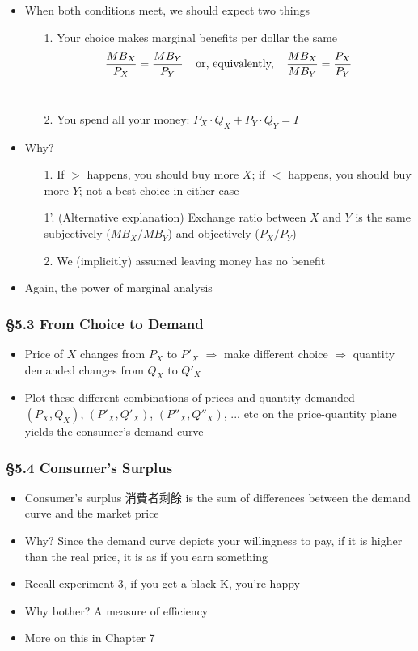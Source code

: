 \documentclass[12pt, xcolor=dvipsnames]{beamer}
\begin{document}
\begin{frame}
\begin{itemize}
	\item When both conditions meet, we should expect two things
	\begin{itemize}
		\item[1.] Your choice makes marginal benefits per dollar the same
		\[{MB_X\over P_X}={MB_Y\over P_Y} \;\;\;\;\mbox{or, equivalently,}\;\;\;\; {MB_X\over MB_Y}={P_X\over P_Y}\] \\[-5mm]
		\item[2.] You spend all your money: $P_X\cdot Q_X+P_Y\cdot Q_Y = I$ \pause
	\end{itemize}
	\item Why?
	\begin{itemize}
		\item[1.] If $>$ happens, you should buy more $X$; if $<$ happens, you should buy more $Y$; not a best choice in either case
		\item[1'.] (Alternative explanation) Exchange ratio between $X$ and $Y$ is the same subjectively ($MB_X/MB_Y$) and objectively ($P_X/P_Y$)
		\item[2.] We (implicitly) assumed leaving money has no benefit
	\end{itemize}
	\item Again, the power of marginal analysis
\end{itemize}
\end{frame}

\begin{frame}
\frametitle{\bf §5.3 From Choice to Demand}
\begin{itemize}
	\item Price of $X$ changes from $P_X$ to $P'_X$ $\Rightarrow$ make different choice $\Rightarrow$ quantity demanded changes from $Q_X$ to $Q'_X$
	\item Plot these different combinations of prices and quantity demanded $(P_X,Q_X)$, $(P'_X,Q'_X)$, $(P''_X,Q''_X)$, ... etc on the price-quantity plane yields the consumer's demand curve
\end{itemize}
\end{frame}


\begin{frame}
\frametitle{\bf §5.4 Consumer's Surplus}
\begin{itemize}
	\item Consumer's surplus 消費者剩餘 is the sum of differences between the demand curve and the market price
	\item Why? Since the demand curve depicts your willingness to pay, if it is higher than the real price, it is as if you earn something
	\item Recall experiment 3, if you get a black K, you're happy
	\item Why bother? A measure of efficiency
	\item More on this in Chapter 7 
\end{itemize}
\end{frame}
\end{document}
